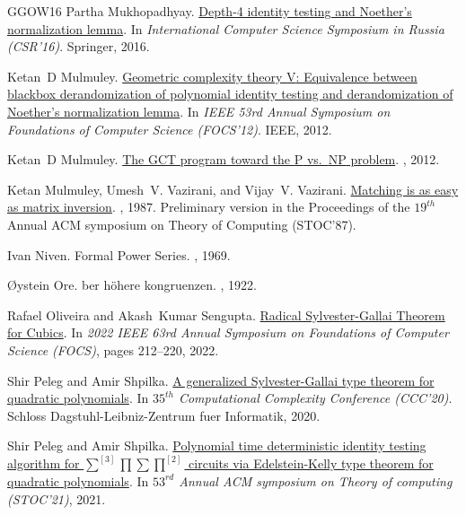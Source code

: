 \documentclass[10pt,a4paper]{article}
\numberwithin{equation}{section}
\begin{document}
\begin{thebibliography}{GGOW16}
Partha Mukhopadhyay.
\newblock
  \href{https://link.springer.com/chapter/10.1007/978-3-319-34171-2_22}{Depth-4
  identity testing and Noether’s normalization lemma}.
\newblock In {\em International Computer Science Symposium in Russia (CSR'16)}.
  Springer, 2016.

Ketan~D Mulmuley.
\newblock \href{https://arxiv.org/abs/1209.5993}{Geometric complexity theory
  {V}: Equivalence between blackbox derandomization of polynomial identity
  testing and derandomization of Noether's normalization lemma}.
\newblock In {\em IEEE 53rd Annual Symposium on Foundations of Computer Science
  (FOCS'12)}. IEEE, 2012.

Ketan~D Mulmuley.
\newblock \href{https://dl.acm.org/doi/10.1145/2184319.2184341}{The GCT program
  toward the {P} vs.~{NP} problem}.
, 2012.

Ketan Mulmuley, Umesh~V. Vazirani, and Vijay~V. Vazirani.
\newblock \href{https://doi.org/10.1007/BF02579206}{Matching is as easy as
  matrix inversion}.
, 1987.
\newblock Preliminary version in the Proceedings of the $19^{th}$ Annual ACM
  symposium on Theory of Computing (STOC'87).

Ivan Niven.
\newblock Formal Power Series.
, 1969.

{\O}ystein Ore.
ber h{\"o}here kongruenzen.
, 1922.

Rafael Oliveira and Akash~Kumar Sengupta.
\newblock \href {http://dx.doi.org/10.1109/FOCS54457.2022.00027} {Radical
  Sylvester-Gallai Theorem for Cubics}.
\newblock In {\em 2022 IEEE 63rd Annual Symposium on Foundations of Computer
  Science (FOCS)}, pages 212--220, 2022.

Shir Peleg and Amir Shpilka.
\newblock \href{https://drops.dagstuhl.de/opus/volltexte/2020/12560/}{A
  generalized Sylvester-Gallai type theorem for quadratic polynomials}.
\newblock In {\em $35^{th}$ Computational Complexity Conference (CCC'20)}.
  Schloss Dagstuhl-Leibniz-Zentrum fuer Informatik, 2020.

Shir Peleg and Amir Shpilka.
\newblock \href{https://dl.acm.org/doi/10.1145/3406325.3451013}{Polynomial time
  deterministic identity testing algorithm for $\sum^{[3]}
  \prod\sum\prod^{[2]}$ circuits via Edelstein-Kelly type theorem for quadratic
  polynomials}.
\newblock In {\em $53^{rd}$ Annual ACM symposium on Theory of computing
  (STOC'21)}, 2021.


\end{thebibliography}
\end{document}
